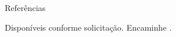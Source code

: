 
\prefix{}
\begin{rubric}{Referências}

{\large Disponíveis conforme solicitação. Encaminhe \href{mailto:contato@danielponte.com.br}{\email}. \par}
\end{rubric}
